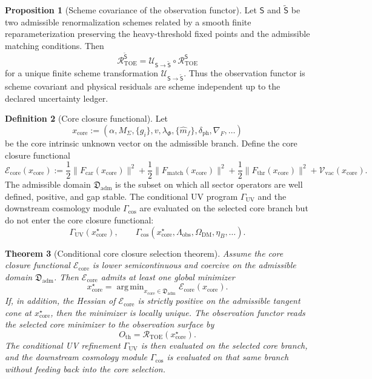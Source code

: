 \documentclass[11pt,a4paper]{article}
\newtheorem{theorem}{Theorem}[section]
\theoremstyle{definition}
\newtheorem{definition}[theorem]{Definition}
\newtheorem{proposition}[theorem]{Proposition}
\theoremstyle{remark}
\DeclareMathOperator{\argmin}{arg\,min}
\begin{document}
\begin{proposition}[Scheme covariance of the observation functor]
Let $\mathsf S$ and $\widetilde{\mathsf S}$ be two admissible renormalization schemes related by
a smooth finite reparameterization preserving the heavy-threshold fixed points and the admissible
matching conditions. Then
\[
\mathcal R_{\mathrm{TOE}}^{\widetilde{\mathsf S}}
=
\mathcal U_{\mathsf S\to\widetilde{\mathsf S}}
\circ
\mathcal R_{\mathrm{TOE}}^{\mathsf S}
\]
for a unique finite scheme transformation $\mathcal U_{\mathsf S\to\widetilde{\mathsf S}}$.
Thus the observation functor is scheme covariant and physical residuals are scheme independent
up to the declared uncertainty ledger.
\end{proposition}

\begin{definition}[Core closure functional]
\label{def:core-closure-functional}
Let
\[
x_{\mathrm{core}}:=(\alpha,M_\Sigma,\{g_i\},v,\lambda_\Phi,\{\hat m_f\},\delta_{\mathrm{ph}},
\nabla_F,\ldots)
\]
be the core intrinsic unknown vector on the admissible branch. Define the core closure
functional
\[
\mathcal E_{\mathrm{core}}(x_{\mathrm{core}}):=
\frac12\|F_{\mathrm{car}}(x_{\mathrm{core}})\|^2
+\frac12\|F_{\mathrm{match}}(x_{\mathrm{core}})\|^2
+\frac12\|F_{\mathrm{thr}}(x_{\mathrm{core}})\|^2
+\mathcal V_{\mathrm{vac}}(x_{\mathrm{core}}).
\]
The admissible domain $\mathfrak D_{\mathrm{adm}}$ is the subset on which all sector operators
are well defined, positive, and gap stable.
The conditional UV program $\Gamma_{\mathrm{UV}}$ and the downstream cosmology module
$\Gamma_{\mathrm{cos}}$ are evaluated on the selected core branch but do not enter the core
closure functional:
\[
\Gamma_{\mathrm{UV}}(x_{\mathrm{core}}^\star),
\qquad
\Gamma_{\mathrm{cos}}(x_{\mathrm{core}}^\star,\Lambda_{\mathrm{obs}},\Omega_{\mathrm{DM}},
\eta_B,\ldots).
\]
\end{definition}

\begin{theorem}[Conditional core closure selection theorem]
\label{thm:observation-closure}
Assume the core closure functional $\mathcal E_{\mathrm{core}}$ is lower semicontinuous and
coercive on the admissible domain $\mathfrak D_{\mathrm{adm}}$. Then
$\mathcal E_{\mathrm{core}}$ admits at least one global minimizer
\[
x_{\mathrm{core}}^\star=\argmin_{x_{\mathrm{core}}\in\mathfrak D_{\mathrm{adm}}}
\mathcal E_{\mathrm{core}}(x_{\mathrm{core}}).
\]
If, in addition, the Hessian of $\mathcal E_{\mathrm{core}}$ is strictly positive on the
admissible tangent cone at $x_{\mathrm{core}}^\star$, then the minimizer is locally unique.
The observation functor reads the selected core minimizer to the observation surface by
\[
O_{\mathrm{th}}=\mathcal R_{\mathrm{TOE}}(x_{\mathrm{core}}^\star).
\]
The conditional UV refinement $\Gamma_{\mathrm{UV}}$ is then evaluated on the selected core
branch, and the downstream cosmology module $\Gamma_{\mathrm{cos}}$ is evaluated on that same
branch without feeding back into the core selection.
\end{theorem}
\end{document}
